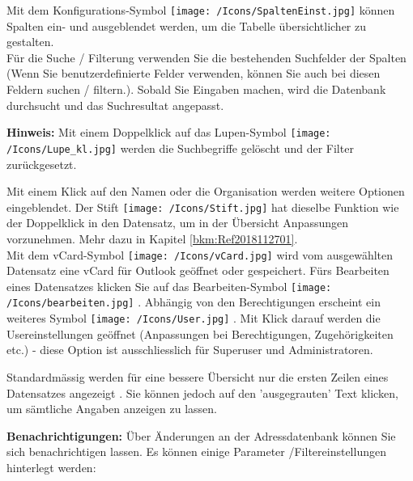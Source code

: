 \vspace{\baselineskip}

Mit dem Konfigurations-Symbol \texttt{[image: /Icons/SpaltenEinst.jpg]}  können Spalten ein- und ausgeblendet werden, um die Tabelle übersichtlicher zu gestalten. \\
Für die Suche / Filterung verwenden Sie die bestehenden Suchfelder  der Spalten (Wenn Sie benutzerdefinierte Felder verwenden, können Sie auch bei diesen Feldern suchen / filtern.). Sobald Sie Eingaben machen, wird die Datenbank durchsucht und das Suchresultat angepasst.

\vspace{\baselineskip}

\textbf{Hinweis:} Mit einem Doppelklick auf das Lupen-Symbol \texttt{[image: /Icons/Lupe\_kl.jpg]}  werden die Suchbegriffe gelöscht und der Filter zurückgesetzt.

\vspace{\baselineskip}

Mit einem Klick auf den Namen  oder die Organisation werden weitere Optionen eingeblendet. Der Stift \texttt{[image: /Icons/Stift.jpg]}  hat dieselbe Funktion wie der Doppelklick in den Datensatz, um in der Übersicht Anpassungen vorzunehmen. Mehr dazu in Kapitel \ref{bkm:Ref2018112701}.\\
Mit dem vCard-Symbol \texttt{[image: /Icons/vCard.jpg]}  wird vom ausgewählten Datensatz eine vCard für Outlook geöffnet oder gespeichert. Fürs Bearbeiten eines Datensatzes klicken Sie auf das Bearbeiten-Symbol \texttt{[image: /Icons/bearbeiten.jpg]} . Abhängig von den Berechtigungen erscheint ein weiteres Symbol \texttt{[image: /Icons/User.jpg]} . Mit Klick darauf werden die Usereinstellungen geöffnet (Anpassungen bei Berechtigungen, Zugehörigkeiten etc.) - diese Option ist ausschliesslich für Superuser und Administratoren.

\vspace{\baselineskip}

Standardmässig werden für eine bessere Übersicht nur die ersten Zeilen eines Datensatzes angezeigt . Sie können jedoch auf den 'ausgegrauten' Text klicken, um sämtliche Angaben anzeigen zu lassen.

\vspace{\baselineskip}

\textbf{Benachrichtigungen:} Über Änderungen an der Adressdatenbank können Sie sich benachrichtigen lassen. Es können einige Parameter  /Filtereinstellungen hinterlegt werden:

